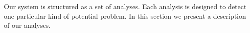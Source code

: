 \label{sec:analysis}
\smvertspace
Our system is structured as a set of analyses. Each analysis is designed to
detect one particular kind of potential problem. In this section we present a
description of our analyses.









